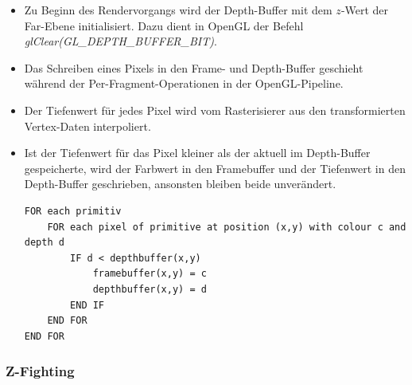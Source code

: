 \documentclass{scrartcl}
\begin{document}
\begin{itemize}
	\item Zu Beginn des Rendervorgangs wird der Depth-Buffer mit dem $z$-Wert der Far-Ebene initialisiert. Dazu dient in OpenGL der Befehl \textit{glClear(GL\_DEPTH\_BUFFER\_BIT)}.
	\item Das Schreiben eines Pixels in den Frame- und Depth-Buffer geschieht während der Per-Fragment-Operationen in der OpenGL-Pipeline.
	\item Der Tiefenwert für jedes Pixel wird vom Rasterisierer aus den transformierten Vertex-Daten interpoliert.
	\item Ist der Tiefenwert für das Pixel kleiner als der aktuell im Depth-Buffer gespeicherte, wird der Farbwert in den Framebuffer und der Tiefenwert in den Depth-Buffer geschrieben, ansonsten bleiben beide unverändert. \\
	\begin{lstlisting}
FOR each primitiv
	FOR each pixel of primitive at position (x,y) with colour c and depth d
		IF d < depthbuffer(x,y)
			framebuffer(x,y) = c
			depthbuffer(x,y) = d
		END IF
	END FOR
END FOR
	\end{lstlisting}
\end{itemize}

\subsubsection{Z-Fighting}
\end{document}
